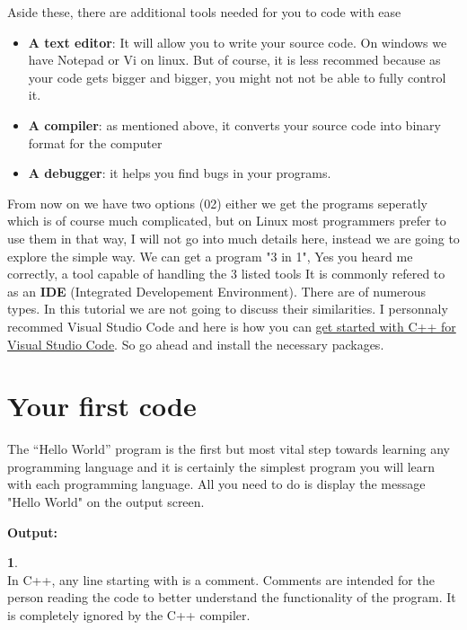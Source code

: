 \documentclass[11pt, a4paper]{article}
\begin{document}
Aside these, there are additional tools needed for you to code with ease
\begin{itemize}
    \item \textbf{A text editor}: It will allow you to write your source
    code. On windows we have Notepad or Vi on linux. But of course, it is
    less recommed because as your code gets bigger and bigger, you might not 
    not be  able to fully control it.
    \item \textbf{A compiler}: as mentioned above, it converts your source code into
    binary format for the computer
    \item \textbf{A debugger}: it helps you find bugs in your programs.
\end{itemize}
From now on we have two options (02) either we get the programs seperatly
which is of course much complicated, but on Linux most programmers prefer
to use them in that way, I will not go into much details here, instead we
are going to explore the simple way. We can get a program "3 in 1",
Yes you heard me correctly, a tool capable of handling the 3 listed tools
It is commonly refered to as an \textbf{IDE} (Integrated Developement Environment).
There are of numerous types. In this tutorial we are not going to discuss
their similarities. I personnaly recommed Visual Studio Code and here is
how you can \href{https://code.visualstudio.com/docs/languages/cpp}
{get started with C++ for Visual Studio Code}. So go ahead and install the
necessary packages.

\section{Your first code}
The “Hello World” program is the first but most vital step towards
learning any programming language and it is certainly the simplest
program you will learn with each programming language. All you need
to do is display the message "Hello World" on the output screen.


\noindent \textbf{Output:}


\noindent
\textbf{1}. \\
In C++, any line starting with \fbox{\color{green!60!black}//} is a comment. Comments are
intended for the person reading the code to better understand the
functionality of the program. It is completely ignored by the C++
compiler.
\end{document}
